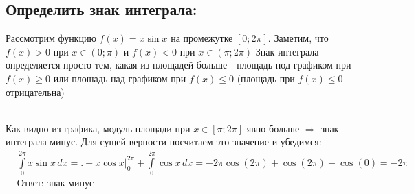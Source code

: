 \documentclass[a4paper, 12pt]{article}
\newcommand{\lr}[1]{\left({#1}\right)}
\begin{document}
\subsection{Определить знак интеграла: }
Рассмотрим функцию $f(x) = x\sin x$ на промежутке $[0;2\pi]$. Заметим, что 
$f(x) > 0$ при $x\in(0;\pi)$ и $f(x)<0$ при $x\in(\pi;2\pi)$ Знак интеграла определяется просто тем, какая из площадей больше - площадь под графиком при $f(x)\geq0$ или плошадь над графиком при $f(x)\leq 0$ (площадь при $f(x)\leq0$ отрицательна) \\ 
 \\
Как видно из графика, модуль площади при $x\in[\pi;2\pi]$ явно больше $\Rightarrow$ знак интеграла минус. Для сущей верности посчитаем это значение и убедимся:
\begin{align*} 
    &{\int\limits_0^{2\pi} x\sin x \,dx} = \Big.-x\cos x\Big|_0^{2\pi} + \int\limits_0^{2\pi} \cos x\, dx = -2\pi\cos\lr{2\pi} + \cos\lr{2\pi} - \cos\lr{0} = {-2\pi}\\
    &\mbox{Ответ: знак минус}
\end{align*}
\end{document}
